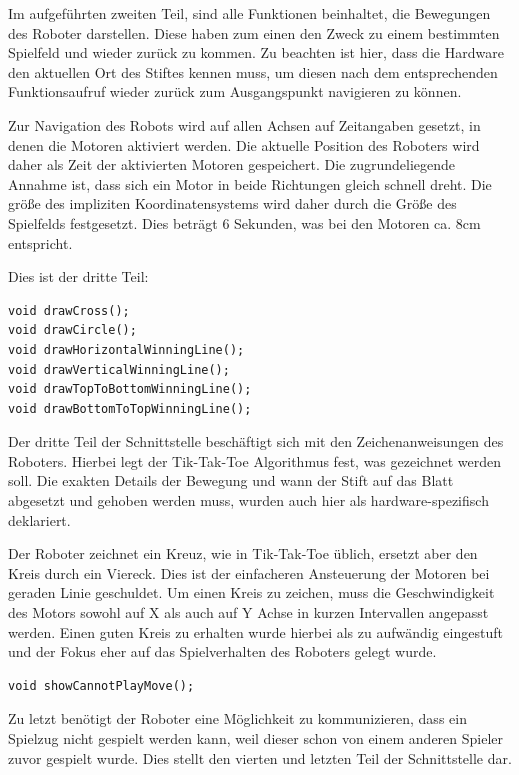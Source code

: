 \documentclass[conference,compsoc,final,a4paper]{IEEEtran}
\begin{document}
Im aufgeführten zweiten Teil, sind alle Funktionen beinhaltet, die Bewegungen des Roboter darstellen. Diese haben
zum einen den Zweck zu einem bestimmten Spielfeld und wieder zurück zu kommen. Zu beachten ist hier,
dass die Hardware den aktuellen Ort des Stiftes kennen muss, um diesen nach dem entsprechenden Funktionsaufruf
wieder zurück zum Ausgangspunkt navigieren zu können.

Zur Navigation des Robots wird auf allen Achsen auf Zeitangaben gesetzt, in denen die Motoren aktiviert werden. Die
aktuelle Position des Roboters wird daher als Zeit der aktivierten Motoren gespeichert. Die zugrundeliegende Annahme
ist, dass sich ein Motor in beide Richtungen gleich schnell dreht. Die größe des impliziten Koordinatensystems wird
daher durch die Größe des Spielfelds festgesetzt. Dies beträgt 6 Sekunden, was bei den Motoren ca. 8cm entspricht.

Dies ist der dritte Teil:

\begin{verbatim}
void drawCross();
void drawCircle();
void drawHorizontalWinningLine();
void drawVerticalWinningLine();
void drawTopToBottomWinningLine();
void drawBottomToTopWinningLine();
\end{verbatim}

Der dritte Teil der Schnittstelle beschäftigt sich mit den Zeichenanweisungen des Roboters. Hierbei legt der
Tik-Tak-Toe Algorithmus fest, was gezeichnet werden soll. Die exakten Details der Bewegung und wann der Stift
auf das Blatt abgesetzt und gehoben werden muss, wurden auch hier als hardware-spezifisch deklariert.

Der Roboter zeichnet ein Kreuz, wie in Tik-Tak-Toe üblich, ersetzt aber den Kreis durch ein Viereck. Dies ist
der einfacheren Ansteuerung der Motoren bei geraden Linie geschuldet. Um einen Kreis zu zeichen, muss die
Geschwindigkeit des Motors sowohl auf X als auch auf Y Achse in kurzen Intervallen angepasst werden. Einen 
guten Kreis zu erhalten wurde hierbei als zu aufwändig eingestuft und der Fokus eher auf das Spielverhalten
des Roboters gelegt wurde.

\begin{verbatim}
void showCannotPlayMove();
\end{verbatim}

Zu letzt benötigt der Roboter eine Möglichkeit zu kommunizieren, dass ein Spielzug nicht gespielt werden kann,
weil dieser schon von einem anderen Spieler zuvor gespielt wurde. Dies stellt den vierten und letzten Teil der
Schnittstelle dar.
\end{document}
